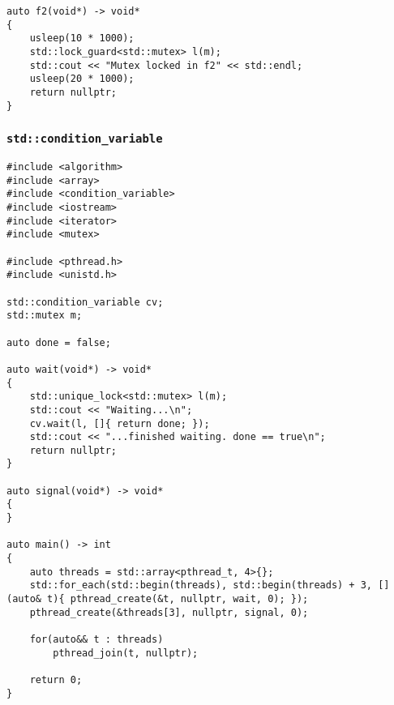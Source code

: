 \begin{appendix}
\begin{lstlisting}
auto f2(void*) -> void*
{
    usleep(10 * 1000);
    std::lock_guard<std::mutex> l(m);
    std::cout << "Mutex locked in f2" << std::endl;
    usleep(20 * 1000);
    return nullptr;
}
\end{lstlisting}

\subsubsection{\texttt{std::condition\_variable}}\label{app:scorep_sync_cv}

\begin{lstlisting}
#include <algorithm>
#include <array>
#include <condition_variable>
#include <iostream>
#include <iterator>
#include <mutex>

#include <pthread.h>
#include <unistd.h>

std::condition_variable cv;
std::mutex m;

auto done = false;

auto wait(void*) -> void*
{
    std::unique_lock<std::mutex> l(m);
    std::cout << "Waiting...\n";
    cv.wait(l, []{ return done; });
    std::cout << "...finished waiting. done == true\n";
    return nullptr;
}

auto signal(void*) -> void*
{
}

auto main() -> int
{
    auto threads = std::array<pthread_t, 4>{};
    std::for_each(std::begin(threads), std::begin(threads) + 3, [](auto& t){ pthread_create(&t, nullptr, wait, 0); });
    pthread_create(&threads[3], nullptr, signal, 0);
    
    for(auto&& t : threads)
        pthread_join(t, nullptr);
        
    return 0;
}
\end{lstlisting}

\end{appendix}